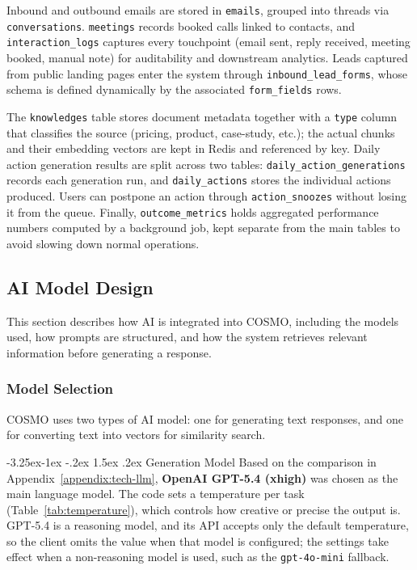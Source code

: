 \documentclass[a4paper]{article}
\makeatletter
\newcounter {subsubsubsection}[subsubsection]
\newcommand\subsubsubsection{\@startsection{subsubsubsection}{4}{\z@}%
	{-3.25ex\@plus -1ex \@minus -.2ex}%
	{1.5ex \@plus .2ex}%
	{\normalfont\normalsize\bfseries}}
\makeatother
\begin{document}
Inbound and outbound emails are stored in \texttt{emails}, grouped into threads
via \texttt{conversations}. \texttt{meetings} records booked calls linked to
contacts, and \texttt{interaction\_logs} captures every touchpoint
(email sent, reply received, meeting booked, manual note) for auditability and
downstream analytics. Leads captured from public landing pages enter the system
through \texttt{inbound\_lead\_forms}, whose schema is defined dynamically by
the associated \texttt{form\_fields} rows.

The \texttt{knowledges} table stores document metadata together with a
\texttt{type} column that classifies the source (pricing, product,
case-study, etc.); the actual chunks and their embedding vectors are kept in
Redis and referenced by key. Daily action generation results are split across
two tables: \texttt{daily\_action\_generations} records each generation run,
and \texttt{daily\_actions} stores the individual actions produced. Users can
postpone an action through \texttt{action\_snoozes} without losing it from the
queue. Finally, \texttt{outcome\_metrics} holds aggregated performance
numbers computed by a background job, kept separate from the main tables to
avoid slowing down normal operations.



\subsection{AI Model Design}

This section describes how AI is integrated into COSMO, including the models used,
how prompts are structured, and how the system retrieves relevant information
before generating a response.

\subsubsection{Model Selection}

COSMO uses two types of AI model: one for generating text responses, and one for
converting text into vectors for similarity search.

\subsubsubsection{Generation Model}
Based on the comparison in Appendix~\ref{appendix:tech-llm}, \textbf{OpenAI GPT-5.4 (xhigh)} was chosen
as the main language model. The code sets a temperature per task
(Table~\ref{tab:temperature}), which controls how creative or precise the output
is. GPT-5.4 is a reasoning model, and its API accepts only the default
temperature, so the client omits the value when that model is configured; the
settings take effect when a non-reasoning model is used, such as the
\texttt{gpt-4o-mini} fallback.
\end{document}
